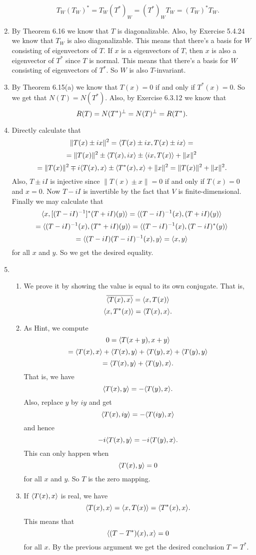 \begin{enumerate}
\begin{enumerate}
\[T_W(T_W)^*=T_W(T^*)_W=(T^*)_WT_W=(T_W)^*T_W.\]
\end{enumerate}
\item By Theorem 6.16 we know that $T$ is diagonalizable. Also, by Exercise 5.4.24 we know that $T_W$ is also diagonalizable. This means that there's a basis for $W$ consisting of eigenvectors of $T$. If $x$ is a eigenvectors of $T$, then $x$ is also a eigenvector of $T^*$ since $T$ is normal. This means that there's a basis for $W$ consisting of eigenvectors of $T^*$. So $W$ is also $T$-invariant.
\item By Theorem 6.15(a) we know that $T(x)=0$ if and only if $T^*(x)=0$. So we get that $N(T)=N(T^*)$. Also, by Exercise 6.3.12 we know that 
\[R(T)=N(T^*)^{\perp} =N(T)^{\perp} =R(T^*).\]
\item Directly calculate that 
\[\|T(x)\pm ix\|^2=\langle T(x)\pm ix,T(x)\pm ix\rangle =\]
\[=\|T(x)\|^2\pm \langle T(x),ix\rangle \pm \langle ix,T(x)\rangle +\|x\|^2\]
\[=\|T(x)\|^2\mp i\langle T(x),x\rangle \pm \langle T^*(x),x\rangle +\|x\|^2=\|T(x)\|^2+\|x\|^2.\]
Also, $T\pm iI$ is injective since $\|T(x)\pm x\|=0$ if and only if $T(x)=0$ and $x=0$. Now $T-iI$ is invertible by the fact that $V$ is finite-dimensional. Finally we may calculate that 
\[\langle x,[(T-iI)^{-1}]^*(T+iI)(y)\rangle =\langle (T-iI)^{-1}(x),(T+iI)(y)\rangle \]
\[=\langle (T-iI)^{-1}(x),(T^*+iI)(y)\rangle =\langle (T-iI)^{-1}(x),(T-iI)^*(y)\rangle \]
\[=\langle (T-iI)(T-iI)^{-1}(x),y\rangle =\langle x,y\rangle \]
for all $x$ and $y$. So we get the desired equality.
\item \begin{enumerate}
\item We prove it by showing the value is equal to its own conjugate. That is,
\[\overline{\langle T(x),x\rangle }=\langle x,T(x)\rangle \]
\[\langle x,T^*(x)\rangle =\langle T(x),x\rangle .\]
\item As Hint, we compute 
\[0=\langle T(x+y),x+y\rangle \]
\[=\langle T(x),x\rangle +\langle T(x),y\rangle +\langle T(y),x\rangle +\langle T(y),y\rangle \]
\[=\langle T(x),y\rangle +\langle T(y),x\rangle .\]
That is, we have 
\[\langle T(x),y\rangle =-\langle T(y),x\rangle .\]
Also, replace $y$ by $iy$ and get 
\[\langle T(x),iy\rangle =-\langle T(iy),x\rangle \]
and hence
\[-i\langle T(x),y\rangle =-i\langle T(y),x\rangle .\]
This can only happen when 
\[\langle T(x),y\rangle =0\]
for all $x$ and $y$. So $T$ is the zero mapping.
\item If $\langle T(x),x\rangle $ is real, we have 
\[\langle T(x),x\rangle =\langle x,T(x)\rangle =\langle T^*(x),x\rangle .\]
This means that 
\[\langle (T-T^*)(x),x\rangle =0\]
for all $x$. By the previous argument we get the desired conclusion $T=T^*$.
\end{enumerate}

\end{enumerate}

